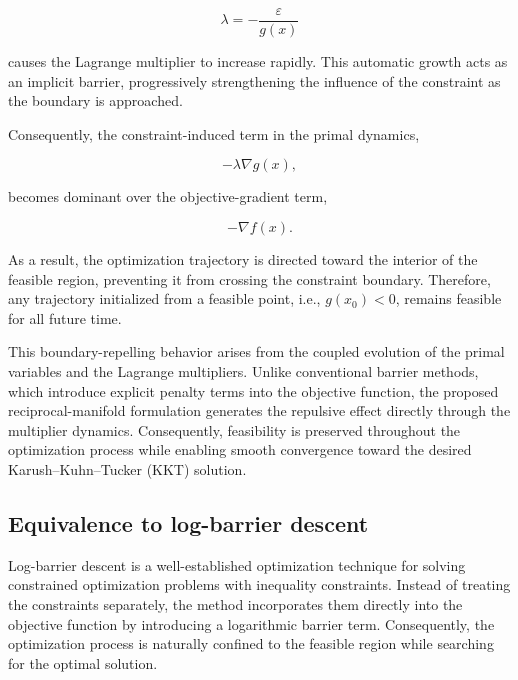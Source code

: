 \documentclass[11pt,onecolumn]{article}
\theoremstyle{definition}
\theoremstyle{remark}
\begin{document}
\begin{equation}
\lambda=-\frac{\varepsilon}{g(x)}
\label{eq:reciprocal_relation}
\end{equation}

causes the Lagrange multiplier to increase rapidly. This automatic growth acts as an implicit barrier, progressively strengthening the influence of the constraint as the boundary is approached.

Consequently, the constraint-induced term in the primal dynamics,

\begin{equation}
-\lambda\nabla g(x),
\label{eq:constraint_force}
\end{equation}

becomes dominant over the objective-gradient term,

\begin{equation}
-\nabla f(x).
\label{eq:objective_force}
\end{equation}

As a result, the optimization trajectory is directed toward the interior of the feasible region, preventing it from crossing the constraint boundary. Therefore, any trajectory initialized from a feasible point, i.e., $g(x_{0})<0$, remains feasible for all future time.

This boundary-repelling behavior arises from the coupled evolution of the primal variables and the Lagrange multipliers. Unlike conventional barrier methods, which introduce explicit penalty terms into the objective function, the proposed reciprocal-manifold formulation generates the repulsive effect directly through the multiplier dynamics. Consequently, feasibility is preserved throughout the optimization process while enabling smooth convergence toward the desired Karush--Kuhn--Tucker (KKT) solution.

\subsection{Equivalence to log-barrier descent}

Log-barrier descent is a well-established optimization technique for solving constrained optimization problems with inequality constraints. Instead of treating the constraints separately, the method incorporates them directly into the objective function by introducing a logarithmic barrier term. Consequently, the optimization process is naturally confined to the feasible region while searching for the optimal solution.
\end{document}
